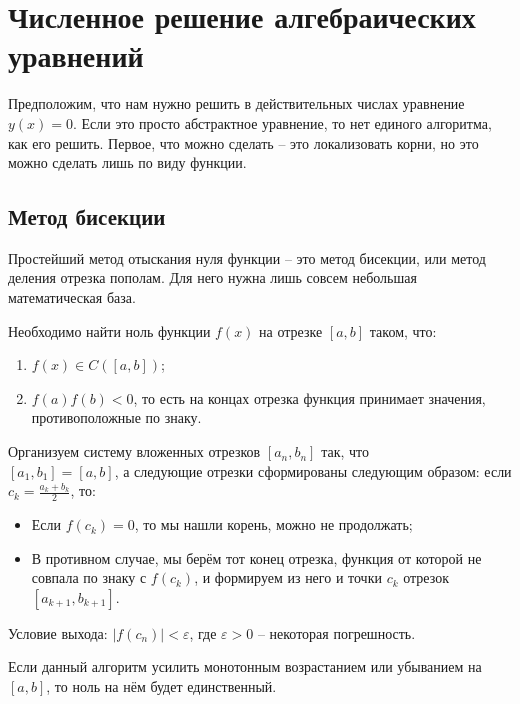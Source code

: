 \documentclass[../main.tex]{subfile}
\begin{document}
\section{Численное решение алгебраических уравнений}

Предположим, что нам нужно решить в действительных числах уравнение
$y(x)=0$. Если это просто абстрактное уравнение, то нет единого
алгоритма, как его решить. Первое, что можно сделать -- это локализовать
корни, но это можно сделать лишь по виду функции.

\subsection{Метод бисекции}

Простейший метод отыскания нуля функции -- это метод бисекции, или метод
деления отрезка пополам. Для него нужна лишь совсем небольшая математическая
база.

\begin{algorithm}
	Необходимо найти ноль функции $f(x)$ на отрезке $[a,b]$ таком, что:
	\begin{enumerate}
		\item $f(x)\in C([a,b])$;
		\item $f(a)f(b)<0$, то есть на концах отрезка функция
			принимает значения, противоположные по знаку.
	\end{enumerate}\leavevmode\newline

	Организуем систему вложенных отрезков $[a_n, b_n]$ так, что\\
	$[a_1, b_1]=[a,b]$, а следующие отрезки сформированы следующим образом:
	если $c_k=\frac{a_k+b_k}{2}$, то:
	\begin{itemize}[noitemsep, nolistsep]
		\item Если $f(c_k)=0$, то мы нашли корень, можно не продолжать;
		\item В противном случае, мы берём тот конец отрезка, функция от
			которой не совпала по знаку с $f(c_k)$, и формируем из него
			и точки $c_k$ отрезок $[a_{k+1},b_{k+1}]$.
	\end{itemize}

	Условие выхода: $|f(c_n)|<\varepsilon$, где $\varepsilon>0$ -- некоторая
	погрешность.

	Если данный алгоритм усилить монотонным возрастанием или убыванием на $[a,b]$,
	то ноль на нём будет единственный.
\end{algorithm}
\end{document}

